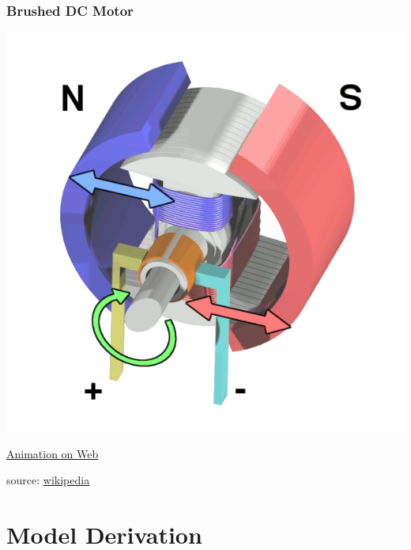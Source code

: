 \documentclass[fleqn]{beamer}                  %
\newcommand{\sectiontitleI}{Brushed DC Motor}
\newcommand{\sectiontitleII}{Model Derivation}
\begin{document}
	\begin{frame}[label=sectionI] \small
		\frametitle{\sectiontitleI}

		\includegraphics[scale=.25]{Electric_motor_cycle_2.png}

		\href{https://en.wikipedia.org/wiki/DC_motor}{Animation on Web} 

		\btVFill
		\tiny{source: \href{https://en.wikipedia.org/wiki/DC_motor}{wikipedia}}
	\end{frame}	

    \section{\sectiontitleII}
\end{document}
